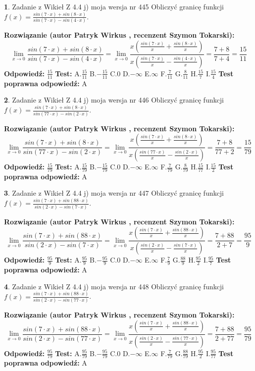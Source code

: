 \documentclass[12pt, a4paper]{article}
\theoremstyle{definition} %
\newtheorem{zad}{}
\newcommand{\zadStart}[1]{\begin{zad}#1\newline}
\newcommand{\zadStop}{\end{zad}}
\newcommand{\rozwStart}[2]{\noindent \textbf{Rozwiązanie (autor #1 , recenzent #2): }\newline}
\newcommand{\rozwStop}{\newline}
\newcommand{\odpStart}{\noindent \textbf{Odpowiedź:}\newline}
\newcommand{\odpStop}{\newline}
\newcommand{\testStart}{\noindent \textbf{Test:}\newline}
\newcommand{\testStop}{\newline}
\newcommand{\kluczStart}{\noindent \textbf{Test poprawna odpowiedź:}\newline}
\newcommand{\kluczStop}{\newline}
\begin{document}
\zadStart{Zadanie z Wikieł Z 4.4 j) moja wersja nr 445}
Obliczyć granicę funkcji $f(x)=\frac{sin(7\cdot x) +sin(8\cdot x)}{sin(7\cdot x) -sin(4\cdot x)}$.
\zadStop
\rozwStart{Patryk Wirkus}{Szymon Tokarski}
$$\lim\limits_{x\to 0}\frac{sin(7\cdot x) +sin(8\cdot x)}{sin(7\cdot x) -sin(4\cdot x)}=\lim\limits_{x\to 0}\frac{x(\frac{sin(7\cdot x)}{x}+\frac{sin(8\cdot x)}{x})}{x(\frac{sin(7\cdot x)}{x}-\frac{sin(4\cdot x)}{x})}=\frac{7+8}{7+4} = \frac{15}{11}$$
\rozwStop
\odpStart
$\frac{15}{11}$
\odpStop
\testStart
A.$\frac{15}{11}$
B.$-\frac{15}{11}$
C.$0$
D.$-\infty$
E.$\infty$
F.$\frac{7}{11}$
G.$\frac{8}{11}$
H.$\frac{15}{7}$
I.$\frac{15}{4}$
\testStop
\kluczStart
A
\kluczStop



\zadStart{Zadanie z Wikieł Z 4.4 j) moja wersja nr 446}
Obliczyć granicę funkcji $f(x)=\frac{sin(7\cdot x) +sin(8\cdot x)}{sin(77\cdot x) -sin(2\cdot x)}$.
\zadStop
\rozwStart{Patryk Wirkus}{Szymon Tokarski}
$$\lim\limits_{x\to 0}\frac{sin(7\cdot x) +sin(8\cdot x)}{sin(77\cdot x) -sin(2\cdot x)}=\lim\limits_{x\to 0}\frac{x(\frac{sin(7\cdot x)}{x}+\frac{sin(8\cdot x)}{x})}{x(\frac{sin(77\cdot x)}{x}-\frac{sin(2\cdot x)}{x})}=\frac{7+8}{77+2} = \frac{15}{79}$$
\rozwStop
\odpStart
$\frac{15}{79}$
\odpStop
\testStart
A.$\frac{15}{79}$
B.$-\frac{15}{79}$
C.$0$
D.$-\infty$
E.$\infty$
F.$\frac{7}{79}$
G.$\frac{8}{79}$
H.$\frac{15}{77}$
I.$\frac{15}{2}$
\testStop
\kluczStart
A
\kluczStop



\zadStart{Zadanie z Wikieł Z 4.4 j) moja wersja nr 447}
Obliczyć granicę funkcji $f(x)=\frac{sin(7\cdot x) +sin(88\cdot x)}{sin(2\cdot x) -sin(7\cdot x)}$.
\zadStop
\rozwStart{Patryk Wirkus}{Szymon Tokarski}
$$\lim\limits_{x\to 0}\frac{sin(7\cdot x) +sin(88\cdot x)}{sin(2\cdot x) -sin(7\cdot x)}=\lim\limits_{x\to 0}\frac{x(\frac{sin(7\cdot x)}{x}+\frac{sin(88\cdot x)}{x})}{x(\frac{sin(2\cdot x)}{x}-\frac{sin(7\cdot x)}{x})}=\frac{7+88}{2+7} = \frac{95}{9}$$
\rozwStop
\odpStart
$\frac{95}{9}$
\odpStop
\testStart
A.$\frac{95}{9}$
B.$-\frac{95}{9}$
C.$0$
D.$-\infty$
E.$\infty$
F.$\frac{7}{9}$
G.$\frac{88}{9}$
H.$\frac{95}{2}$
I.$\frac{95}{7}$
\testStop
\kluczStart
A
\kluczStop



\zadStart{Zadanie z Wikieł Z 4.4 j) moja wersja nr 448}
Obliczyć granicę funkcji $f(x)=\frac{sin(7\cdot x) +sin(88\cdot x)}{sin(2\cdot x) -sin(77\cdot x)}$.
\zadStop
\rozwStart{Patryk Wirkus}{Szymon Tokarski}
$$\lim\limits_{x\to 0}\frac{sin(7\cdot x) +sin(88\cdot x)}{sin(2\cdot x) -sin(77\cdot x)}=\lim\limits_{x\to 0}\frac{x(\frac{sin(7\cdot x)}{x}+\frac{sin(88\cdot x)}{x})}{x(\frac{sin(2\cdot x)}{x}-\frac{sin(77\cdot x)}{x})}=\frac{7+88}{2+77} = \frac{95}{79}$$
\rozwStop
\odpStart
$\frac{95}{79}$
\odpStop
\testStart
A.$\frac{95}{79}$
B.$-\frac{95}{79}$
C.$0$
D.$-\infty$
E.$\infty$
F.$\frac{7}{79}$
G.$\frac{88}{79}$
H.$\frac{95}{2}$
I.$\frac{95}{77}$
\testStop
\kluczStart
A
\kluczStop
\end{document}
